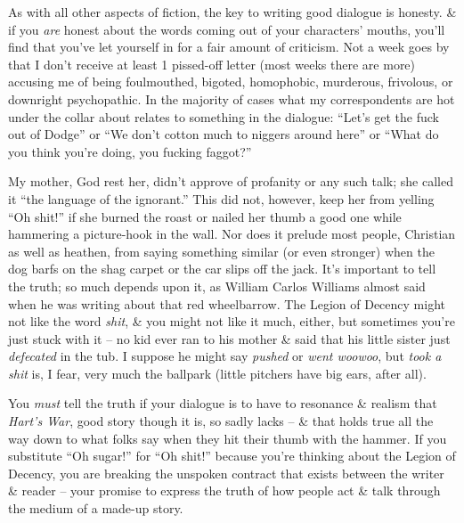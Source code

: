 \documentclass{article}
\numberwithin{equation}{section}
\begin{document}
As with all other aspects of fiction, the key to writing good dialogue is honesty. \& if you \textit{are} honest about the words coming out of your characters' mouths, you'll find that you've let yourself in for a fair amount of criticism. Not a week goes by that I don't receive at least 1 pissed-off letter (most weeks there are more) accusing me of being foulmouthed, bigoted, homophobic, murderous, frivolous, or downright psychopathic. In the majority of cases what my correspondents are hot under the collar about relates to something in the dialogue: ``Let's get the fuck out of Dodge'' or ``We don't cotton much to niggers around here'' or ``What do you think you're doing, you fucking faggot?''

My mother, God rest her, didn't approve of profanity or any such talk; she called it ``the language of the ignorant.'' This did not, however, keep her from yelling ``Oh shit!'' if she burned the roast or nailed her thumb a good one while hammering a picture-hook in the wall. Nor does it prelude most people, Christian as well as heathen, from saying something similar (or even stronger) when the dog barfs on the shag carpet or the car slips off the jack. It's important to tell the truth; so much depends upon it, as William Carlos Williams almost said when he was writing about that red wheelbarrow. The Legion of Decency might not like the word \textit{shit}, \& you might not like it much, either, but sometimes you're just stuck with it -- no kid ever ran to his mother \& said that his little sister just \textit{defecated} in the tub. I suppose he might say \textit{pushed} or \textit{went woowoo}, but \textit{took a shit} is, I fear, very much the ballpark (little pitchers have big ears, after all).

You \textit{must} tell the truth if your dialogue is to have to resonance \& realism that \textit{Hart's War}, good story though it is, so sadly lacks -- \& that holds true all the way down to what folks say when they hit their thumb with the hammer. If you substitute ``Oh sugar!'' for ``Oh shit!'' because you're thinking about the Legion of Decency, you are breaking the unspoken contract that exists between the writer \& reader -- your promise to express the truth of how people act \& talk through the medium of a made-up story.
\end{document}
